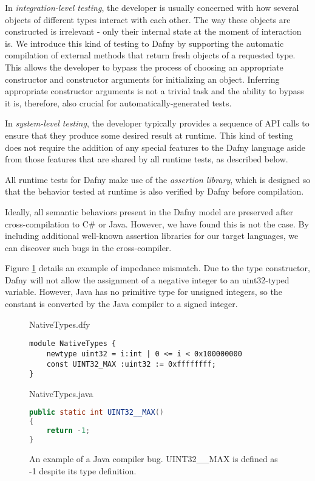 \documentclass[runningheads]{llncs}
\begin{document}
In \textit{integration-level testing}, the developer is usually concerned with how several objects of different types interact with each other. 
The way these objects are constructed is irrelevant - only their internal state at the moment of interaction is. 
We introduce this kind of testing to Dafny by supporting the automatic compilation of external methods that return fresh objects of a requested type. 
This allows the developer to bypass the process of choosing an appropriate constructor and constructor arguments for initializing an object. 
Inferring appropriate constructor arguments is not a trivial task and the ability to bypass it is, therefore, also crucial for automatically-generated tests.

In \textit{system-level testing}, the developer typically provides a sequence of API calls to ensure that they produce some desired result at runtime. 
This kind of testing does not require the addition of any special features to the Dafny language aside from those features that are shared by all runtime tests, as described below. 

All runtime tests for Dafny make use of the \textit{assertion library}, which is designed so that the behavior tested at runtime is also verified by Dafny before compilation. 

Ideally, all semantic behaviors present in the Dafny model are preserved after cross-compilation to C\# or Java. 
However, we have found this is not the case. 
By including additional well-known assertion libraries for our target languages, we can discover such bugs in the cross-compiler.

Figure \ref{compilerBug} details an example of impedance mismatch. 
Due to the type constructor, Dafny will not allow the assignment of a negative integer to an uint32-typed variable. 
However, Java has no primitive type for unsigned integers, so the constant is converted by the Java compiler to a signed integer.

\begin{figure}[h]
NativeTypes.dfy
\begin{lstlisting}[language=dafny,basicstyle=\ttfamily\footnotesize]
module NativeTypes {
    newtype uint32 = i:int | 0 <= i < 0x100000000
    const UINT32_MAX :uint32 := 0xffffffff;
}
\end{lstlisting}
NativeTypes.java
\begin{lstlisting}[language=java,basicstyle=\ttfamily\footnotesize]
public static int UINT32__MAX()
{
    return -1;
}
\end{lstlisting}
\caption{An example of a Java compiler bug.  UINT32\_\_MAX is defined as -1 despite its type definition.}
\label{compilerBug}
\end{figure}
\end{document}
